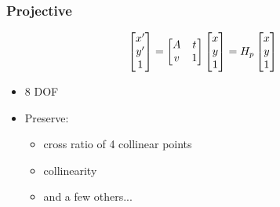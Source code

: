 \subsubsection{Projective}
$$\begin{bmatrix}
	x' \\ y' \\ 1
\end{bmatrix}=\begin{bmatrix}
	A & t\\ v & 1
\end{bmatrix}\begin{bmatrix}
	x \\ y \\  1
\end{bmatrix}=H_p \begin{bmatrix}
	x\\y\\1
\end{bmatrix}\\$$
\begin{itemize}
	\item 8 DOF
	\item Preserve:
	\begin{itemize}
		\item cross ratio of 4 collinear points
		\item collinearity
		\item and a few others...
	\end{itemize}
\end{itemize}